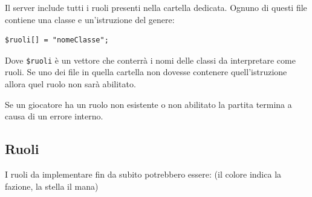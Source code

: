 \documentclass[10pt,a4paper]{article}
\begin{document}
Il server include tutti i ruoli presenti nella cartella dedicata. Ognuno di questi file contiene una classe e un'istruzione del genere:
\begin{verbatim}
$ruoli[] = "nomeClasse";
\end{verbatim}

Dove \texttt{\$ruoli} è un vettore che conterrà i nomi delle classi da interpretare come ruoli. Se uno dei file in quella cartella non dovesse contenere quell'istruzione allora quel ruolo non sarà abilitato.

Se un giocatore ha un ruolo non esistente o non abilitato la partita termina a causa di un errore interno.

\subsection{Ruoli}
I ruoli da implementare fin da subito potrebbero essere: (il colore indica la fazione, la stella il mana)
\end{document}
